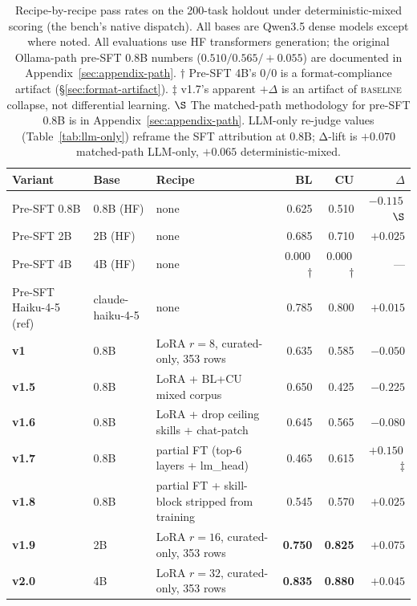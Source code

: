 \documentclass[10pt]{article}
\newcommand{\BL}{\textsc{baseline}\xspace}
\begin{document}
\begin{table}[h]
\centering
\small
\begin{tabularx}{\textwidth}{@{}l l Y r r r@{}}
\toprule
\textbf{Variant} & \textbf{Base} & \textbf{Recipe} & \textbf{BL} & \textbf{CU} & \textbf{$\Delta$} \\
\midrule
Pre-SFT 0.8B & 0.8B (HF)     & none & 0.625 & 0.510 & $-0.115$\,$\S$ \\
Pre-SFT 2B   & 2B (HF)       & none & 0.685 & 0.710 & $+0.025$ \\
Pre-SFT 4B   & 4B (HF)       & none & $0.000$\,$\dagger$ & $0.000$\,$\dagger$ & --- \\
Pre-SFT Haiku-4-5 (ref) & claude-haiku-4-5 & none & 0.785 & 0.800 & $+0.015$ \\
\addlinespace
\textbf{v1}    & 0.8B & LoRA $r{=}8$, curated-only, 353 rows           & 0.635 & 0.585 & $-0.050$ \\
\textbf{v1.5}  & 0.8B & LoRA + BL+CU mixed corpus                       & 0.650 & 0.425 & $-0.225$ \\
\textbf{v1.6}  & 0.8B & LoRA + drop ceiling skills + chat-patch         & 0.645 & 0.565 & $-0.080$ \\
\textbf{v1.7}  & 0.8B & partial FT (top-6 layers + lm\_head)            & 0.465 & 0.615 & $+0.150$\,$\ddagger$ \\
\textbf{v1.8}  & 0.8B & partial FT + skill-block stripped from training & 0.545 & 0.570 & $+0.025$ \\
\textbf{v1.9}  & 2B   & LoRA $r{=}16$, curated-only, 353 rows           & \textbf{0.750} & \textbf{0.825} & $\boldsymbol{+0.075}$ \\
\textbf{v2.0}  & 4B   & LoRA $r{=}32$, curated-only, 353 rows           & \textbf{0.835} & \textbf{0.880} & $\boldsymbol{+0.045}$ \\
\bottomrule
\end{tabularx}
\caption{Recipe-by-recipe pass rates on the 200-task holdout under deterministic-mixed scoring (the bench's native dispatch). All bases are Qwen3.5 dense models except where noted. All evaluations use HF transformers generation; the original Ollama-path pre-SFT 0.8B numbers ($0.510 / 0.565 / +0.055$) are documented in Appendix~\ref{sec:appendix-path}. $\dagger$ Pre-SFT 4B's $0/0$ is a format-compliance artifact (\S\ref{sec:format-artifact}). $\ddagger$ v1.7's apparent $+\Delta$ is an artifact of \BL{} collapse, not differential learning. $\S$ The matched-path methodology for pre-SFT 0.8B is in Appendix~\ref{sec:appendix-path}. LLM-only re-judge values (Table~\ref{tab:llm-only}) reframe the SFT attribution at 0.8B; Δ-lift is $+0.070$ matched-path LLM-only, $+0.065$ deterministic-mixed.}
\label{tab:headline}
\end{table}
\end{document}
